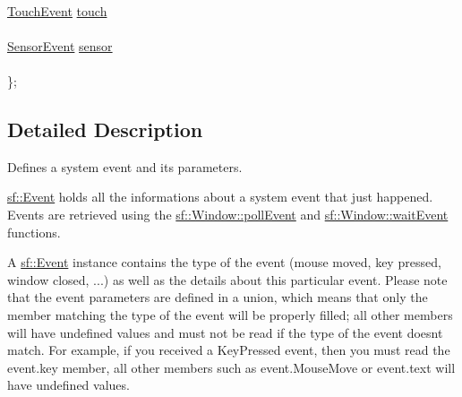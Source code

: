 \begin{DoxyCompactItemize}
\begin{tabbing}
\>\\
\>\hyperlink{structsf_1_1_event_1_1_touch_event}{TouchEvent} \hyperlink{classsf_1_1_event_a5f6ed8e499a4c3d171ff1baab469b2ee}{touch}\\
\>\\
\>\hyperlink{structsf_1_1_event_1_1_sensor_event}{SensorEvent} \hyperlink{classsf_1_1_event_acdeacbb321655b962e27d08eeec5a190}{sensor}\\
\>\\
\}; \\

\end{tabbing}\end{DoxyCompactItemize}


\subsection{Detailed Description}
Defines a system event and its parameters. 

\hyperlink{classsf_1_1_event}{sf\+::\+Event} holds all the informations about a system event that just happened. Events are retrieved using the \hyperlink{classsf_1_1_window_a338e996585faf82e93069858e3b531b7}{sf\+::\+Window\+::poll\+Event} and \hyperlink{classsf_1_1_window_aaf02ab64fbc1d374eef3696df54137bc}{sf\+::\+Window\+::wait\+Event} functions.

A \hyperlink{classsf_1_1_event}{sf\+::\+Event} instance contains the type of the event (mouse moved, key pressed, window closed, ...) as well as the details about this particular event. Please note that the event parameters are defined in a union, which means that only the member matching the type of the event will be properly filled; all other members will have undefined values and must not be read if the type of the event doesn\textquotesingle{}t match. For example, if you received a Key\+Pressed event, then you must read the event.\+key member, all other members such as event.\+Mouse\+Move or event.\+text will have undefined values.

